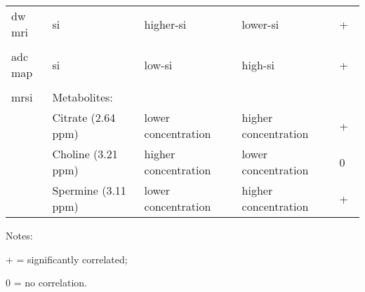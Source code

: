 \begin{landscape}
\begin{table}
\begin{threeparttable}
\begin{tabularx}{\linewidth}{@{} l X X X l @{}}
        \acs*{dw} \acs*{mri} & \acs*{si} & higher-\acs*{si}~\cite{Huisman2003,Barentsz2012} & lower-\acs*{si}~\cite{Huisman2003,Barentsz2012} & + \\ \\ 
        \acs*{adc} map & \acs*{si} & low-\acs*{si}~\cite{Barentsz2012} & high-\acs*{si}~\cite{Barentsz2012} & +~\cite{Hambrock2011, Itou2011, Peng2013} \\ \\
        \acs*{mrsi}& Metabolites: & & & \\
        & Citrate (2.64 ppm)~\cite{Verma2010} & lower concentration~\cite{Awwad2012,Costello2006,Graaf2000} & higher concentration~\cite{Awwad2012,Costello2006,Graaf2000} & +~\cite{Giskeodegard2013} \\
        & Choline (3.21 ppm)~\cite{Verma2010} & higher concentration~\cite{Awwad2012,Costello2006,Graaf2000} & lower concentration~\cite{Awwad2012,Costello2006,Graaf2000} & 0~\cite{Giskeodegard2013} \\
        & Spermine (3.11 ppm)~\cite{Verma2010} & lower concentration~\cite{Awwad2012,Costello2006,Graaf2000} & higher concentration~\cite{Awwad2012,Costello2006,Graaf2000} & +~\cite{Giskeodegard2013} \\ \bottomrule
        
      \end{tabularx}
      \begin{tablenotes}
      \item Notes:
      \item + = significantly correlated;
      \item 0 = no correlation.
      \end{tablenotes}
    \end{threeparttable}
  \label{tab:modmri}
\end{table}
\end{landscape}
